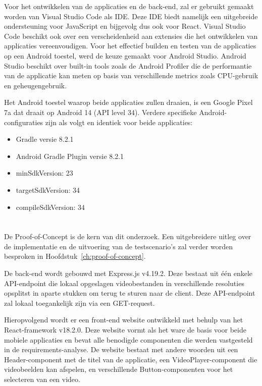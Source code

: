 Voor het ontwikkelen van de applicaties en de back-end, zal er gebruikt gemaakt worden van Visual Studio Code als IDE. Deze IDE biedt namelijk een uitgebreide ondersteuning voor JavaScript en bijgevolg dus ook voor React. Visual Studio Code beschikt ook over een verscheidenheid aan extensies die het ontwikkelen van applicaties vereenvoudigen. Voor het effectief builden en testen van de applicaties op een Android toestel, werd de keuze gemaakt voor Android Studio. Android Studio beschikt over built-in tools zoals de Android Profiler die de performantie van de applicatie kan meten op basis van verschillende metrics zoals CPU-gebruik en geheugengebruik.

Het Android toestel waarop beide applicaties zullen draaien, is een Google Pixel 7a dat draait op Android 14 (API level 34). Verdere specifieke Android-configuraties zijn als volgt en identiek voor beide applicaties:
\begin{itemize}
    \item Gradle versie 8.2.1
    \item Android Gradle Plugin versie 8.2.1
    \item minSdkVersion: 23
    \item targetSdkVersion: 34
    \item compileSdkVersion: 34
\end{itemize}


\section{}%
\label{sec:proof-of-concept}

De Proof-of-Concept is de kern van dit onderzoek. Een uitgebreidere uitleg over de implementatie en de uitvoering van de testscenario's zal verder worden besproken in Hoofdstuk~\ref{ch:proof-of-concept}.

De back-end wordt gebouwd met Express.js v4.19.2. Deze bestaat uit één enkele API-endpoint die lokaal opgeslagen videobestanden in verschillende resoluties opsplitst in aparte stukken om terug te sturen naar de client. Deze API-endpoint zal lokaal toegankelijk zijn via een GET-request.

Hieropvolgend wordt er een front-end website ontwikkeld met behulp van het React-framework v18.2.0. Deze website vormt als het ware de basis voor beide mobiele applicaties en bevat alle benodigde componenten die werden vastgesteld in de requirements-analyse. De website bestaat met andere woorden uit een Header-component met de titel van de applicatie, een VideoPlayer-component die videobeelden kan afspelen, en verschillende Button-componenten voor het selecteren van een video.

